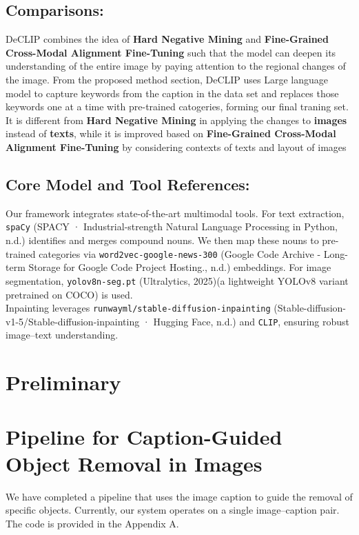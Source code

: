 \documentclass[11pt,letterpaper]{article}
\begin{document}
\subsection{Comparisons:}
DeCLIP combines the idea of \textbf{Hard Negative Mining} and \textbf{Fine-Grained Cross-Modal Alignment Fine-Tuning} such that the model can deepen its understanding of the entire image by paying attention to the regional changes of the image. From the proposed method section, DeCLIP uses Large language model to capture keywords from the caption in the data set and replaces those keywords one at a time with pre-trained catogeries, forming our final traning set. It is different from \textbf{Hard Negative Mining} in applying the changes to \textbf{images} instead of \textbf{texts}, while it is improved based on \textbf{Fine-Grained Cross-Modal Alignment Fine-Tuning} by considering contexts of texts and layout of images
\subsection{Core Model and Tool References:}
Our framework integrates state-of-the-art multimodal tools. For text extraction, \texttt{spaCy} \cite{spacy2025}(SPACY · Industrial-strength Natural Language Processing in Python, n.d.) identifies and merges compound nouns. We then map these nouns to pre-trained categories via \texttt{word2vec-google-news-300} \cite{word2vec2025} (Google Code Archive - Long-term Storage for Google Code Project Hosting., n.d.) embeddings. For image segmentation, \texttt{yolov8n-seg.pt} \cite{ultralytics2023segment} (Ultralytics, 2025)(a lightweight YOLOv8 variant pretrained on COCO) is used.\\ Inpainting leverages \texttt{runwayml/stable-diffusion-inpainting} \cite{stabilityai2023inpainting}(Stable-diffusion-v1-5/Stable-diffusion-inpainting · Hugging Face, n.d.) and \texttt{CLIP}, ensuring robust image–text understanding.





\section{Preliminary}


\section*{Pipeline for Caption-Guided Object Removal in Images}

We have completed a pipeline that uses the image caption to guide the removal of specific objects. Currently, our system operates on a single image--caption pair. The code is provided in the Appendix A.
\end{document}

